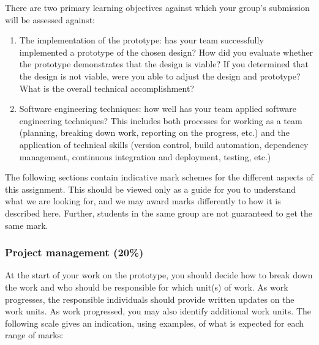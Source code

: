 There are two primary learning objectives against which your group's submission will be assessed against:

\begin{enumerate}
    \item The implementation of the prototype: has your team successfully implemented a prototype of the chosen design? How did you evaluate whether the prototype demonstrates that the design is viable? If you determined that the design is not viable, were you able to adjust the design and prototype? What is the overall technical accomplishment?
    \item Software engineering techniques: how well has your team applied software engineering techniques? This includes both processes for working as a team (planning, breaking down work, reporting on the progress, etc.) and the application of technical skills (version control, build automation, dependency management, continuous integration and deployment, testing, etc.)
\end{enumerate}

The following sections contain indicative mark schemes for the different aspects of this assignment. This should be viewed only as a guide for you to understand what we are looking for, and we may award marks differently to how it is described here. Further, students in the same group are not guaranteed to get the same mark.

\subsubsection{Project management (20\%)}

At the start of your work on the prototype, you should decide how to break down the work and who should be responsible for which unit(s) of work. As work progresses, the responsible individuals should provide written updates on the work units. As work progressed, you may also identify additional work units. The following scale gives an indication, using examples, of what is expected for each range of marks:

